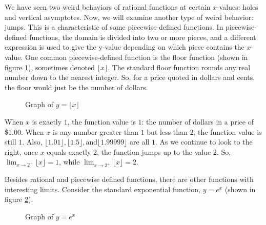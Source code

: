 We have seen two weird behaviors of rational functions at certain $x$-values: holes 
and vertical asymptotes. Now, we will examine another type of weird behavior: jumps. 
This is a characteristic of some piecewise-defined functions. In piecewise-defined 
functions, the domain is divided into two or more pieces, and a different 
expression is used to give the y-value depending on which piece contains the $x$-
value. One common piecewise-defined function is the floor function (shown in 
figure \ref{fig:floor}), sometimes denoted $\lfloor x \rfloor$. The standard 
floor function rounds any real number down to the nearest integer. So, for a 
price quoted in dollars and cents, the floor would just be the number of 
dollars.

\begin{figure}[H]
  \centering
  \caption{Graph of \( y = \lfloor x \rfloor \)}
  \label{fig:floor}
\end{figure}	

When $x$ is exactly $1$, the function value is $1$: the number of dollars in a 
price of \$1.00. When $x$ is any number greater than $1$ but less than $2$, the 
function value is still $1$. Also, $ \lfloor 1.01 \rfloor, \lfloor 1.5 \rfloor, 
\text{and} \lfloor 1.99999 \rfloor$ are all $1$. As we continue to look to the 
right, once $x$ equals exactly $2$, the function jumps up to the value $2$. So, 
$ \lim_{x \rightarrow 2^-} \lfloor x \rfloor = 1 $, while 
$ \lim_{x \rightarrow 2^+} \lfloor x \rfloor = 2 $.

Besides rational and piecewise defined functions, there are other functions with 
interesting limits. Consider the standard exponential function, $y = e^x$ 
(shown in figure \ref{fig:exponent}).

\begin{figure}[H]
  \centering
  \caption{Graph of \( y = e^x \)}
  \label{fig:exponent}
\end{figure}	


